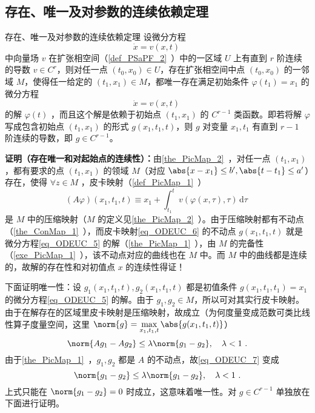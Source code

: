 \subsection{存在、唯一及对参数的连续依赖定理}
\begin{theorem}{存在、唯一及对参数的连续依赖定理}\label{the_ODEUC_1}
设微分方程
\begin{equation}\label{eq_ODEUC_9}
\dot x=v(x,t)~
\end{equation}
中向量场 $v$ 在扩张相空间（\autoref{def_PSaPF_2}~）中的一区域 $U$ 上有直到 $r$ 阶连续的导数 $v\in C^r$，则对任一点 $(t_0,x_0)\in U$，存在扩张相空间中点 $(t_0,x_0)$ 的一邻域 $M$，使得任一给定的 $(t_1,x_1)\in M$，都唯一存在满足初始条件 $\varphi(t_1)=x_1$ 的微分方程
\begin{equation}\label{eq_ODEUC_5}
\dot x=v(x,t)~
\end{equation}
的解 $\varphi(t)$ ，而且这个解是依赖于初始点 $(t_1,x_1)$ 的 $C^{r-1}$ 类函数。即若将解 $\varphi$ 写成包含初始点 $(t_1,x_1)$ 的形式 $g(x_1,t_1,t)$，则 $g$ 对变量 $x_1,t_1$ 有直到 $r-1$ 阶连续的导数，即 $g\in C^{r-1}$。
\end{theorem}
\textbf{证明（存在唯一和对起始点的连续性）：}由\autoref{the_PicMap_2}~，对任一点 $(t_1,x_1)$，都有要求的点 $(t_1,x_1)$ 的领域 $M$（对应 $\abs{x-x_1}\leq b',\abs{t-t_1}\leq a'$）存在，使得 $\forall z\in M$ ，皮卡映射（\autoref{def_PicMap_1}~）
\begin{equation}\label{eq_ODEUC_6}
(A\varphi)(x_1,t_1,t)\equiv x_1+\int_{t_1}^{t}v(\varphi(x,\tau),\tau) \,\mathrm{d}{\tau} ~
\end{equation}
是 $M$ 中的压缩映射（$M$ 的定义见\autoref{the_PicMap_2}~）。由于压缩映射都有不动点（\autoref{the_ConMap_1}~），而皮卡映射\autoref{eq_ODEUC_6} 的不动点 $g(x_1,t_1,t)$ 就是微分方程\autoref{eq_ODEUC_5} 的解（\autoref{the_PicMap_1}~），由 $M$ 的完备性（\autoref{exe_PicMap_1}~），该不动点对应的曲线也在 $M$ 中。而 $M$ 中的曲线都是连续的，故解的存在性和对初值点 $x$ 的连续性得证！

下面证明唯一性：设 $g_1(x_1,t_1,t),g_2(x_1,t_1,t)$ 都是初值条件 $g(x_1,t_1,t_1)=x_1$ 的微分方程\autoref{eq_ODEUC_5} 的解。由于 $g_1,g_2\in M$，所以可对其实行皮卡映射。由于在解存在的区域里皮卡映射是压缩映射，故成立（为何度量变成范数可类比线性算子度量空间，这里 $\norm{g}=\max\limits_{x_1,t_1,t}\abs{g(x_1,t_1,t)}$）
\begin{equation}\label{eq_ODEUC_7}
\norm{A g_1-A g_2}\leq\lambda\norm{g_1-g_2},\quad\lambda<1~.
\end{equation}
由于\autoref{the_PicMap_1}~，$g_1,g_2$ 都是 $A$ 的不动点，故\autoref{eq_ODEUC_7} 变成
\begin{equation}
\norm{g_1-g_2}\leq\lambda\norm{g_1-g_2},\quad\lambda<1~.
\end{equation}
上式只能在 $\norm{g_1-g_2}=0$ 时成立，这意味着唯一性。对 $g\in C^{r-1}$ 单独放在下面进行证明。

